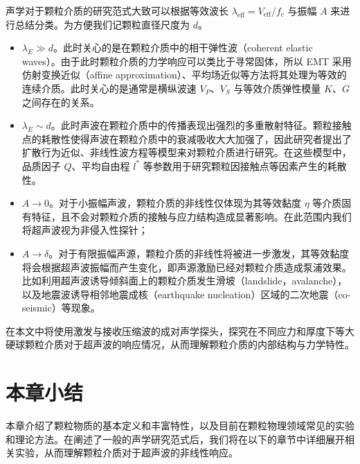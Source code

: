 声学对于颗粒介质的研究范式大致可以根据等效波长 $\lambda_{\text{eff}} = V_{\text{eff}}/f_{c}$ 与振幅 $A$ 来进行总结分类。为方便我们记颗粒直径尺度为 $d$。

\begin{itemize}
  \item $\lambda_{E}\gg d$。此时关心的是在颗粒介质中的相干弹性波（coherent elastic waves）。由于此时颗粒介质的力学响应可以类比于寻常固体，所以 EMT 采用仿射变换近似（affine approximation）、平均场近似等方法将其处理为等效的连续介质。此时关心的是通常是横纵波速 $V_{P}$、$V_{S}$ 与等效介质弹性模量 $K$、$G$ 之间存在的关系。
  \item $\lambda_{E}\sim d$。此时声波在颗粒介质中的传播表现出强烈的多重散射特征。颗粒接触点的耗散性使得声波在颗粒介质中的衰减吸收大大加强了，因此研究者提出了扩散行为近似\cite{PhysRevLett.93.154303}、非线性波方程\cite{Transitional,hamilton_nonlinear_1998}等模型来对颗粒介质进行研究。在这些模型中，品质因子 $Q$、平均自由程 $l^{*}$ 等参数用于研究颗粒因接触点等因素产生的耗散性。
  \item $A\rightarrow 0$。对于小振幅声波，颗粒介质的非线性仅体现为其等效黏度 $\eta$ 等介质固有特征，且不会对颗粒介质的接触与应力结构造成显著影响。在此范围内我们将超声波视为非侵入性探针；
  \item $A\rightarrow \delta$。对于有限振幅声源，颗粒介质的非线性将被进一步激发，其等效黏度将会根据超声波振幅而产生变化，即声源激励已经对颗粒介质造成泵浦效果。比如利用超声波诱导倾斜面上的颗粒介质发生滑坡（landslide，avalanche）\cite{PhysRevE.102.042901}，以及地震波诱导相邻地震成核（earthquake nucleation）区域的二次地震（co-seismic）\cite{Johnson_2005}等现象。
\end{itemize}

在本文中将使用激发与接收压缩波的成对声学探头，探究在不同应力和厚度下等大硬球颗粒介质对于超声波的响应情况，从而理解颗粒介质的内部结构与力学特性。

\section{本章小结}

本章介绍了颗粒物质的基本定义和丰富特性，以及目前在颗粒物理领域常见的实验和理论方法。在阐述了一般的声学研究范式后，我们将在以下的章节中详细展开相关实验，从而理解颗粒介质对于超声波的非线性响应。